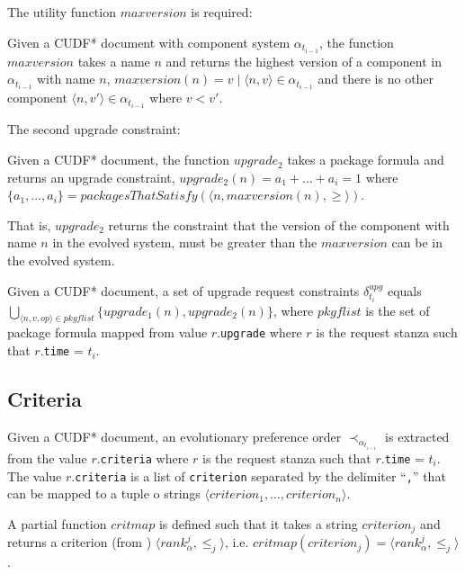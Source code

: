 The utility function $maxversion$ is required:
\begin{defs}
Given a CUDF* document with component system $\alpha_{t_{i-1}}$, the function $maxversion$ takes a name $n$ and returns the highest version of a component in $\alpha_{t_{i-1}}$ with name $n$,
$maxversion(n) = v  \mid \langle n,v \rangle \in \alpha_{t_{i-1}}$ and there is no other component $\langle n,v' \rangle \in \alpha_{t_{i-1}}$ where $v < v'$.
\end{defs}

The second upgrade constraint:
\begin{defs}
Given a CUDF* document, the function $upgrade_2$ takes a package formula and returns an upgrade constraint,
$upgrade_2(n) = a_1 + \ldots + a_i = 1$ where $\{a_1,\ldots,a_i\} = packagesThatSatisfy(\langle n,maxversion(n),\geq\rangle)$. 
\end{defs}
That is, $upgrade_2$ returns the constraint that the version of the component with name $n$ in the evolved system, must be greater than the $maxversion$ can be in the evolved system.

\begin{defs}
Given a CUDF* document, a set of upgrade request constraints $\delta_{t_i}^{upg}$ equals $\bigcup \limits_{\langle n,v,op \rangle \in pkgflist} \{upgrade_1(n),upgrade_2(n)\}$, 
where $pkgflist$ is the set of package formula mapped from value $r$.\texttt{upgrade} where $r$ is the request stanza such that $r$.\texttt{time} = $t_i$.
\end{defs}

\subsection{Criteria}
Given a CUDF* document, an evolutionary preference order $\prec_{\alpha_{t_{i-1}}}$ is extracted from the value $r$.\texttt{criteria} where $r$ is the request stanza such that $r$.\texttt{time} = $t_i$.
The value $r$.\texttt{criteria} is a list of \verb+criterion+ separated by the delimiter ``\verb+,+'' that can be mapped to a tuple o strings $\langle criterion_1, \ldots, criterion_n \rangle$.

\begin{defs}
A partial function $critmap$ is defined such that it takes a string $criterion_j$ and returns a criterion (from \modelname) $\langle rank^j_{\alpha}, \leq_j \rangle$, 
i.e. $critmap(criterion_j) = \langle rank^j_{\alpha}, \leq_j \rangle$.
\end{defs} 

